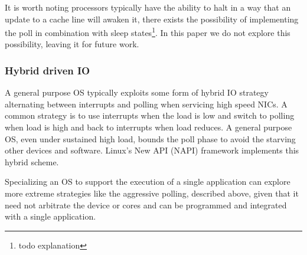 It is worth noting processors typically have the ability to halt in a way that an update to a cache line will awaken it, there exists the possibility of implementing the poll in combination with sleep states\footnote{todo explanation}. In this paper we do not explore this possibility, leaving it for future work.

\subsubsection{Hybrid driven IO}
\label{sec:workflow:hybridio}
A general purpose OS typically exploits some form of hybrid IO strategy alternating between interrupts and polling when servicing high speed NICs. A common strategy is to use interrupts when the load is low and switch to polling when load is high and back to interrupts when load reduces.  A general purpose OS, even under sustained high load, bounds the poll phase to avoid the starving other devices and software. Linux's New API (NAPI)\cite{NAPI} framework implements this hybrid scheme.


Specializing an OS to support the execution of a single application can explore more extreme strategies like the aggressive polling, described above, given that it need not arbitrate the device or cores and can be programmed and integrated with a single application.  

